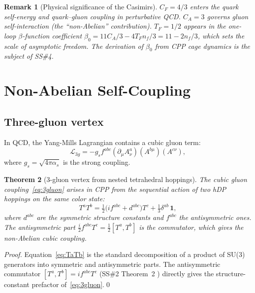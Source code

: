 \documentclass[11pt,a4paper]{article}
\newtheorem{theorem}{Theorem}[section]
\newtheorem{remark}[theorem]{Remark}
\newcommand{\as}{\alpha_s}
\begin{document}
\begin{remark}[Physical significance of the Casimirs]
$C_F = 4/3$ enters the quark self-energy and quark--gluon
coupling in perturbative QCD.  $C_A = 3$ governs
gluon self-interaction (the ``non-Abelian'' contribution).
$T_F = 1/2$ appears in the one-loop $\beta$-function coefficient
$\beta_0 = 11C_A/3 - 4T_F n_f/3 = 11 - 2n_f/3$, which sets
the scale of asymptotic freedom.  The derivation of $\beta_0$
from CPP cage dynamics is the subject of SS\#4.
\end{remark}

\section{Non-Abelian Self-Coupling}

\subsection{Three-gluon vertex}

In QCD, the Yang-Mills Lagrangian contains a cubic gluon term:
\begin{equation}
\mathcal{L}_{3g}
= -g_s f^{abc}(\partial_\mu A^a_\nu)(A^{b\mu})(A^{c\nu}),
\label{eq:3gluon}
\end{equation}
where $g_s = \sqrt{4\pi\as}$ is the strong coupling.

\begin{theorem}[3-gluon vertex from nested tetrahedral hoppings]
\label{thm:3gluon}
The cubic gluon coupling~\eqref{eq:3gluon} arises in CPP from
the sequential action of two hDP hoppings on the same color state:
\begin{equation}
T^a T^b
= \tfrac{1}{2}\bigl(if^{abc} + d^{abc}\bigr)T^c
+ \tfrac{1}{3}\delta^{ab}\,\mathbf{1},
\label{eq:TaTb}
\end{equation}
where $d^{abc}$ are the symmetric structure constants and
$f^{abc}$ the antisymmetric ones.  The antisymmetric part
$\frac{i}{2}f^{abc}T^c = \frac{1}{2}[T^a,T^b]$ is the
commutator, which gives the non-Abelian cubic coupling.
\end{theorem}

\begin{proof}
Equation~\eqref{eq:TaTb} is the standard decomposition of a
product of SU(3) generators into symmetric and antisymmetric
parts.  The antisymmetric commutator $[T^a,T^b] = if^{abc}T^c$
(SS\#2 Theorem~2 \citep{cpp_ss2}) directly gives the
structure-constant prefactor of~\eqref{eq:3gluon}.\qed
\end{proof}
\end{document}
